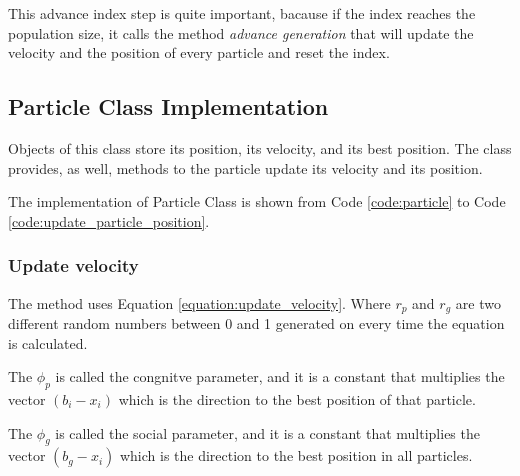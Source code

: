 This advance index step is quite important, bacause if the index reaches the population size, it calls the method \textit{advance generation} that will update the velocity and the position of every particle and reset the index.

\subsection {Particle Class Implementation}

Objects of this class store its position, its velocity, and its best position. The class provides, as well, methods to the particle update its velocity and its position.

The implementation of Particle Class is shown from Code \ref{code:particle} to Code \ref{code:update_particle_position}.







\subsubsection{Update velocity}

The  method uses Equation \ref{equation:update_velocity}. Where $r_p$ and $r_g$ are two different random numbers between 0 and 1 generated on every time the equation is calculated.

The $\phi_p$ is called the congnitve parameter, and it is a constant that multiplies the vector $(b_i - x_i)$ which is the direction to the best position of that particle.

The $\phi_g$ is called the social parameter, and it is a constant that multiplies the vector $(b_g - x_i)$ which is the direction to the best position in all particles.

